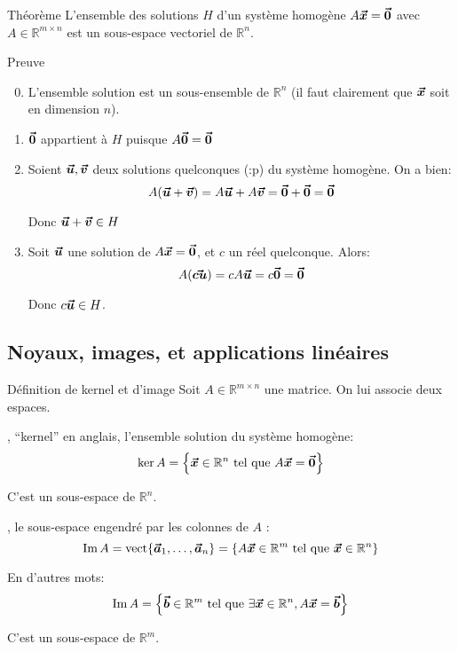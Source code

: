 \documentclass[a4paper]{article}
\begin{document}
\begin{parag}{Théorème}
    L'ensemble des solutions $H$ d'un système homogène $A \bm{\protect\vec{x}} = \bm{\protect\vec{0}}$ avec $A \in \mathbb{R}^{m \times n}$ est un sous-espace vectoriel de $\mathbb{R}^{n}$.

    \begin{subparag}{Preuve}
        \begin{enumerate}[left=0pt]
            \setcounter{enumi}{-1}
            \item L'ensemble solution est un sous-ensemble de $\mathbb{R}^{n}$ (il faut clairement que $\bm{\protect\vec{x}}$ soit en dimension $n$).
            \item $\bm{\protect\vec{0}}$ appartient à $H$ puisque $A \bm{\protect\vec{0}} = \bm{\protect\vec{0}}$
            \item Soient $\bm{\protect\vec{u}}, \bm{\protect\vec{v}}$ deux solutions quelconques (:p) du système homogène. On a bien:
            \[A\left(\bvec{u} + \bvec{v}\right) = A \bvec{u} + A \bvec{v} = \bvec{0} + \bvec{0} = \bvec{0}\]

            Donc $\bm{\protect\vec{u}} + \bm{\protect\vec{v}} \in H$

            \item Soit $\bm{\protect\vec{u}}$ une solution de $A \bm{\protect\vec{x}} = \bm{\protect\vec{0}}$, et $c$ un réel quelconque. Alors:
            \[A\left(\bvec{cu}\right) = cA \bvec{u} = c \bvec{0} = \bvec{0}\]

            Donc $c \bm{\protect\vec{u}} \in H$.
        \end{enumerate}

    \end{subparag}

\end{parag}

\subsection{Noyaux, images, et applications linéaires}
\begin{parag}{Définition de kernel et d'image}
    Soit $A \in \mathbb{R}^{m \times n}$ une matrice. On lui associe deux espaces.

    , ``kernel'' en anglais, l'ensemble solution du système homogène:
    \[\ker A = \left\{\bvec{x} \in \mathbb{R}^{n} \telque A \bvec{x} = \bvec{0}\right\}\]

    C'est un sous-espace de $\mathbb{R}^{n}$.

    , le sous-espace engendré par les colonnes de $A$ :
    \[\im A = \vect\left\{\bvec{a}_1, \ldots, \bvec{a}_n\right\} = \left\{A \bvec{x} \in \mathbb{R}^{m} \telque \bvec{x} \in \mathbb{R}^{n}\right\}\]

    En d'autres mots:
    \[\im A = \left\{\bvec{b} \in \mathbb{R}^{m} \telque \exists \bvec{x} \in \mathbb{R}^{n}, A \bvec{x} = \bvec{b}\right\}\]


    C'est un sous-espace de $\mathbb{R}^{m}$.
\end{parag}
\end{document}
